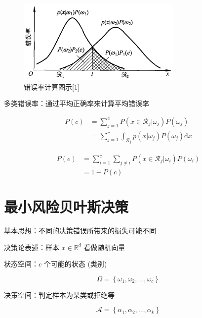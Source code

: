 \documentclass[openany,a4paper,12pt]{ctexbook}
\theoremstyle{kaiti}
\theoremstyle{normal}
\begin{document}
\begin{figure}
  \centering
  \includegraphics[width=8cm]{1627807965262-1.2.png}
  \caption{错误率计算图示[1]}
\end{figure}

多类错误率：通过平均正确率来计算平均错误率

\begin{equation}
\begin{aligned}
  P\left(c \right)
  &=\sum_{j=1}^c{P\left(x\in \mathcal{R}_j|\omega_j \right)P\left(\omega_j \right)}\\
  &=\sum_{j=1}^c{\int_{\mathcal{R}_j}{p\left(x|\omega_j \right)P\left(\omega_j \right)}}\mathrm{d}x
\end{aligned}
\end{equation}

\begin{equation}
\begin{aligned}
  P\left(e \right)
  &=\sum_{i=1}^c{\sum_{j\ne i}{P\left(x\in \mathcal{R}_j|\omega_i \right)P\left(\omega_i \right)}}\\
  &=1-P\left(c \right)
\end{aligned}
\end{equation}

\section{最小风险贝叶斯决策}

基本思想：不同的决策错误所带来的损失可能不同

决策论表述：样本 $x\in\mathbb{R}^d$ 看做随机向量

状态空间：$c$ 个可能的状态 (类别) 

\begin{equation}
\Omega =\left\{ \omega_1,\omega_2,\dots ,\omega_c \right\}
\end{equation}

决策空间：判定样本为某类或拒绝等

\begin{equation}
\mathcal{A} =\left\{ \alpha_1,\alpha_2,\dots ,\alpha_k \right\}
\end{equation}
\end{document}
